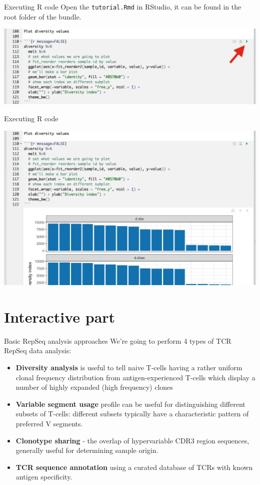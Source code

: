 \documentclass[12pt]{beamer}
\begin{document}
\begin{frame}{Executing R code}
Open the \texttt{tutorial.Rmd} in RStudio, it can be found in the root folder of the bundle.
\begin{center}
\includegraphics[width=\textwidth]{p8}
\end{center}
\end{frame}

\begin{frame}{Executing R code}
\begin{center}
\includegraphics[width=\textwidth]{p9}
\end{center}
\end{frame}

\section{Interactive part}

\begin{frame}{Basic RepSeq analysis approaches}
We're going to perform 4 types of TCR RepSeq data analysis:
\begin{itemize}
\item \textbf{Diversity analysis} is useful to tell naive T-cells having a rather uniform clonal frequency distribution from antigen-experienced T-cells which display a number of highly expanded (high frequency) clones
\pause
\item \textbf{Variable segment usage} profile can be useful for distinguishing different subsets of T-cells: different subsets typically have a characteristic pattern of preferred V segments.
\pause
\item \textbf{Clonotype sharing} - the overlap of hypervariable CDR3 region sequences, generally useful for determining sample origin.
\pause
\item \textbf{TCR sequence annotation} using a curated database of TCRs with known antigen specificity.
\end{itemize} 
\end{frame}
\end{document}
